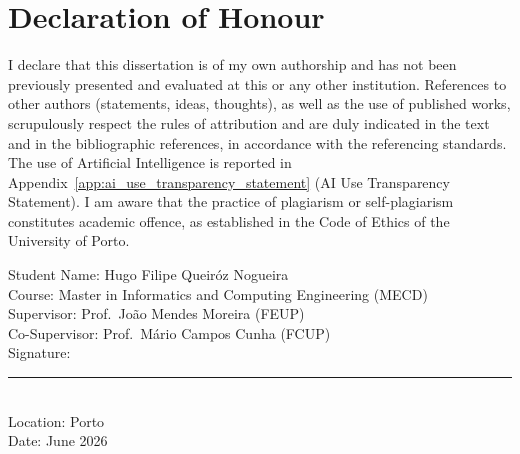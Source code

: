 \chapter*{Declaration of Honour}

I declare that this dissertation is of my own authorship and has not been previously presented and evaluated at this or any other institution. References to other authors (statements, ideas, thoughts), as well as the use of published works, scrupulously respect the rules of attribution and are duly indicated in the text and in the bibliographic references, in accordance with the referencing standards. The use of Artificial Intelligence is reported in Appendix~\ref{app:ai_use_transparency_statement} (AI Use Transparency Statement). I am aware that the practice of plagiarism or self-plagiarism constitutes academic offence, as established in the Code of Ethics of the University of Porto.

\vspace{10mm}
\noindent Student Name: Hugo Filipe Queir\'oz Nogueira \\
\noindent Course: Master in Informatics and Computing Engineering (MECD) \\
\noindent Supervisor: Prof.\ Jo\~ao Mendes Moreira (FEUP) \\
\noindent Co-Supervisor: Prof.\ M\'ario Campos Cunha (FCUP) \\[8mm]
\noindent Signature: \rule{6cm}{1pt} \\
\noindent Location: Porto \\
\noindent Date: June 2026

